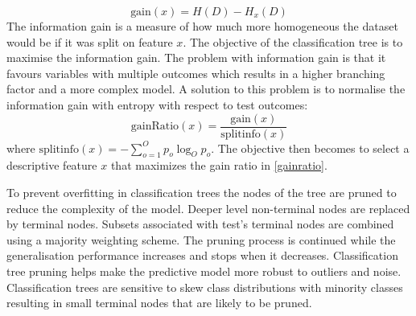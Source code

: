 \documentclass[conference]{IEEEtran}
\begin{document}
	\begin{equation}
		\text{gain}(x)=H(D)-H_x(D) \label{gain}
	\end{equation}
	The information gain is a measure of how much more homogeneous the dataset would be if it was split on feature $x$. The objective of the classification tree is to maximise the information gain. The problem with information gain is that it favours variables with multiple outcomes which results in a higher branching factor and a more complex model. A solution to this problem is to normalise the information gain with entropy with respect to test outcomes:
	\begin{equation}
		\text{gainRatio}(x)=\frac{\text{gain}(x)}{\text{splitinfo}(x)} \label{gainratio}
	\end{equation}
	where $\text{splitinfo}(x)=-\sum^O_{o=1}p_o\log_Op_o$. The objective then becomes to select a descriptive feature $x$ that maximizes the gain ratio in \eqref{gainratio}.
	
	To prevent overfitting in classification trees the nodes of the tree are pruned to reduce the complexity of the model. Deeper level non-terminal nodes are replaced by terminal nodes. Subsets associated with test's terminal nodes are combined using a majority weighting scheme. The pruning process is continued while the generalisation performance increases and stops when it decreases. Classification tree pruning helps make the predictive model more robust to outliers and noise. Classification trees are sensitive to skew class distributions with minority classes resulting in small terminal nodes that are likely to be pruned.
	
\end{document}
